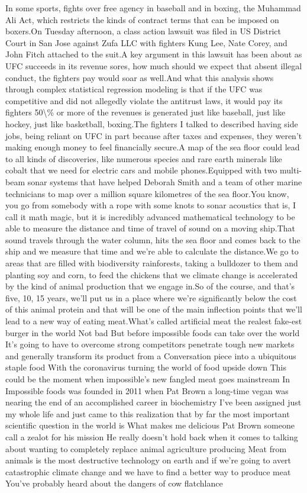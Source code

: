 \documentclass{article}%
\begin{document}
In some sports, fights over free agency in baseball and in boxing, the Muhammad Ali Act, which restricts the kinds of contract terms that can be imposed on boxers.On Tuesday afternoon, a class action lawsuit was filed in US District Court in San Jose against Zufa LLC with fighters Kung Lee, Nate Corey, and John Fitch attached to the suit.A key argument in this lawsuit has been about as UFC succeeds in its revenue sores, how much should we expect that absent illegal conduct, the fighters pay would soar as well.And what this analysis shows through complex statistical regression modeling is that if the UFC was competitive and did not allegedly violate the antitrust laws, it would pay its fighters 50\textbackslash{}\% or more of the revenues is generated just like baseball, just like hockey, just like basketball, boxing.The fighters I talked to described having side jobs, being reliant on UFC in part because after taxes and expenses, they weren't making enough money to feel financially secure.A map of the sea floor could lead to all kinds of discoveries, like numerous species and rare earth minerals like cobalt that we need for electric cars and mobile phones.Equipped with two multi{-}beam sonar systems that have helped Deborah Smith and a team of other marine technicians to map over a million square kilometres of the sea floor.You know, you go from somebody with a rope with some knots to sonar acoustics that is, I call it math magic, but it is incredibly advanced mathematical technology to be able to measure the distance and time of travel of sound on a moving ship.That sound travels through the water column, hits the sea floor and comes back to the ship and we measure that time and we're able to calculate the distance.We go to areas that are filled with biodiversity rainforests, taking a bulldozer to them and planting soy and corn, to feed the chickens that we climate change is accelerated by the kind of animal production that we engage in.So of the course, and that's five, 10, 15 years, we'll put us in a place where we're significantly below the cost of this animal protein and that will be one of the main inflection points that we'll lead to a new way of eating meat.What's called artificial meat the realest fake{-}est burger in the world Not bad But before impossible foods can take over the world It's going to have to overcome strong competitors penetrate tough new markets and generally transform its product from a Conversation piece into a ubiquitous staple food With the coronavirus turning the world of food upside down This could be the moment when impossible's new fangled meat goes mainstream In Impossible foods was founded in 2011 when Pat Brown a long{-}time vegan was nearing the end of an accomplished career in biochemistry I've been assigned just my whole life and just came to this realization that by far the most important scientific question in the world is What makes me delicious Pat Brown someone call a zealot for his mission He really doesn't hold back when it comes to talking about wanting to completely replace animal agriculture producing Meat from animals is the most destructive technology on earth and if we're going to avert catastrophic climate change and we have to find a better way to produce meat You've probably heard about the dangers of cow flatchlance 
\end{document}
